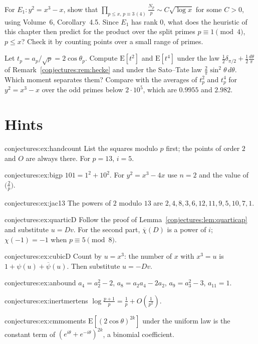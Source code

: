 \begin{exercise}[$\star\star$]\label{conjectures:ex:inertmertens}
For $E_1:y^2=x^3-x$, show that $\prod_{p\le x,\,p\equiv3\,(4)}\frac{N_p}p\sim C\sqrt{\log x}$ for some $C>0$, using Volume~6, Corollary~4.5. Since $E_1$ has rank
$0$, what does the heuristic of this chapter then predict for the product over the split primes $p\equiv1\pmod4$, $p\le x$? Check it by counting points over a small range of primes.
\end{exercise}

\begin{exercise}[$\star\star$]\label{conjectures:ex:cmmoments}
Let $t_p=a_p/\sqrt p=2\cos\theta_p$. Compute $\mathrm E[t^2]$ and $\mathrm E[t^4]$ under the law $\frac12\delta_{\pi/2}+\frac12\frac{d\theta}\pi$ of
Remark~\ref{conjectures:rem:hecke} and under the Sato--Tate law $\frac2\pi\sin^2\theta\,d\theta$. Which moment separates them? Compare with the averages of $t_p^2$ and $t_p^4$
for $y^2=x^3-x$ over the odd primes below $2\cdot10^5$, which are $0.9955$ and $2.982$.
\end{exercise}

\section{Hints}

\begin{hint}{conjectures:ex:handcount}
List the squares modulo $p$ first; the points of order $2$ and $O$ are always there. For $p=13$, $i=5$.
\end{hint}
\begin{hint}{conjectures:ex:bigp}
$101=1^2+10^2$. For $y^2=x^3-4x$ use $n=2$ and the value of $\bigl(\frac2p\bigr)$.
\end{hint}
\begin{hint}{conjectures:ex:jac13}
The powers of $2$ modulo $13$ are $2,4,8,3,6,12,11,9,5,10,7,1$.
\end{hint}
\begin{hint}{conjectures:ex:quarticD}
Follow the proof of Lemma~\ref{conjectures:lem:quarticap} and substitute $u=Dv$. For the second part, $\overline\chi(D)$ is a power of $i$; $\chi(-1)=-1$ when
$p\equiv5\pmod8$.
\end{hint}
\begin{hint}{conjectures:ex:cubicD}
Count by $u=x^3$: the number of $x$ with $x^3=u$ is $1+\psi(u)+\overline\psi(u)$. Then substitute $u=-Dv$.
\end{hint}
\begin{hint}{conjectures:ex:anbound}
$a_4=a_2^2-2$, $a_8=a_2a_4-2a_2$, $a_9=a_3^2-3$, $a_{11}=1$.
\end{hint}
\begin{hint}{conjectures:ex:inertmertens}
$\log\frac{p+1}p=\frac1p+O(\frac1{p^2})$.
\end{hint}
\begin{hint}{conjectures:ex:cmmoments}
$\mathrm E[(2\cos\theta)^{2k}]$ under the uniform law is the constant term of $(e^{i\theta}+e^{-i\theta})^{2k}$, a binomial coefficient.
\end{hint}


